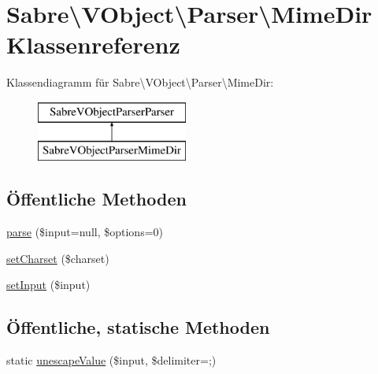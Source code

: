 \hypertarget{class_sabre_1_1_v_object_1_1_parser_1_1_mime_dir}{}\section{Sabre\textbackslash{}V\+Object\textbackslash{}Parser\textbackslash{}Mime\+Dir Klassenreferenz}
\label{class_sabre_1_1_v_object_1_1_parser_1_1_mime_dir}
Klassendiagramm für Sabre\textbackslash{}V\+Object\textbackslash{}Parser\textbackslash{}Mime\+Dir\+:\begin{figure}[H]
\begin{center}
\leavevmode
\includegraphics[height=2.000000cm]{class_sabre_1_1_v_object_1_1_parser_1_1_mime_dir}
\end{center}
\end{figure}
\subsection*{Öffentliche Methoden}
\begin{DoxyCompactItemize}
\item 
\mbox{\hyperlink{class_sabre_1_1_v_object_1_1_parser_1_1_mime_dir_a650b831c2e0cc87e9dd2275531e243e6}{parse}} (\$input=null, \$options=0)
\item 
\mbox{\hyperlink{class_sabre_1_1_v_object_1_1_parser_1_1_mime_dir_a4deec4df6c9a7a24467943948d13eb31}{set\+Charset}} (\$charset)
\item 
\mbox{\hyperlink{class_sabre_1_1_v_object_1_1_parser_1_1_mime_dir_a723e7cf41fe0b461a89169ed57b23947}{set\+Input}} (\$input)
\end{DoxyCompactItemize}
\subsection*{Öffentliche, statische Methoden}
\begin{DoxyCompactItemize}
\item 
static \mbox{\hyperlink{class_sabre_1_1_v_object_1_1_parser_1_1_mime_dir_afa5cc25ac8ea445d6981d4cecde94449}{unescape\+Value}} (\$input, \$delimiter=\textquotesingle{};\textquotesingle{})
\end{DoxyCompactItemize}
